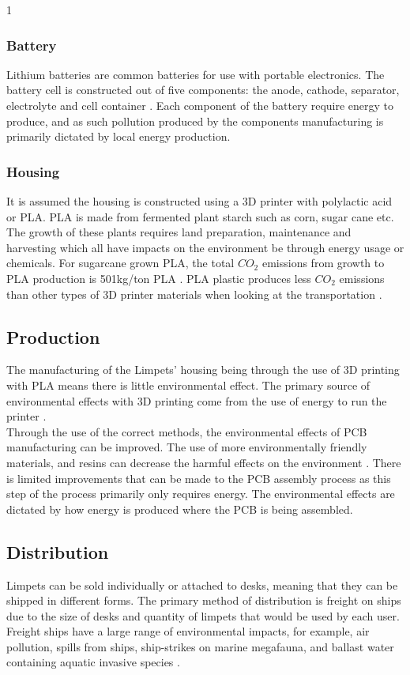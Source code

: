 1\documentclass{article}
\begin{document}
\subsubsection{Battery}
Lithium batteries are common batteries for use with portable electronics. The battery cell is constructed out of five components: the anode, cathode, separator, electrolyte and cell container \cite{BATTLCA_1}. Each component of the battery require energy to produce, and as such pollution produced by the components manufacturing is primarily dictated by local energy production.
\subsubsection{Housing}
It is assumed the housing is constructed using a 3D printer with polylactic acid or PLA. PLA is made from fermented plant starch such as corn, sugar cane etc. The growth of these plants requires land preparation, maintenance and harvesting which all have impacts on the environment be through energy usage or chemicals. For sugarcane grown PLA, the total $CO_2$ emissions from growth to PLA production is 501kg/ton PLA \cite{PLALCA_1}. PLA plastic produces less $CO_2$ emissions than other types of 3D printer materials when looking at the transportation \cite{PLALCA_2}.

\subsection{Production}
The manufacturing of the Limpets' housing being through the use of 3D printing with PLA means there is little environmental effect. The primary source of environmental effects with 3D printing come from the use of energy to run the printer \cite{3dprint}.\\

Through the use of the correct methods, the environmental effects of PCB manufacturing can be improved. The use of more environmentally friendly materials, and resins can decrease the harmful effects on the environment \citep{esfandyari2015lean}. There is limited improvements that can be made to the PCB assembly process as this step of the process primarily only requires energy. The environmental effects are dictated by how energy is produced where the PCB is being assembled.

\subsection{Distribution}
Limpets can be sold individually or attached to desks, meaning that they can be shipped in different forms. The primary method of distribution is freight on ships due to the size of desks and quantity of limpets that would be used by each user. Freight ships have a large range of environmental impacts, for example, air pollution, spills from ships, ship-strikes on marine megafauna, and ballast water containing aquatic invasive species \cite{WALKER2019505}.\\
\end{document}

